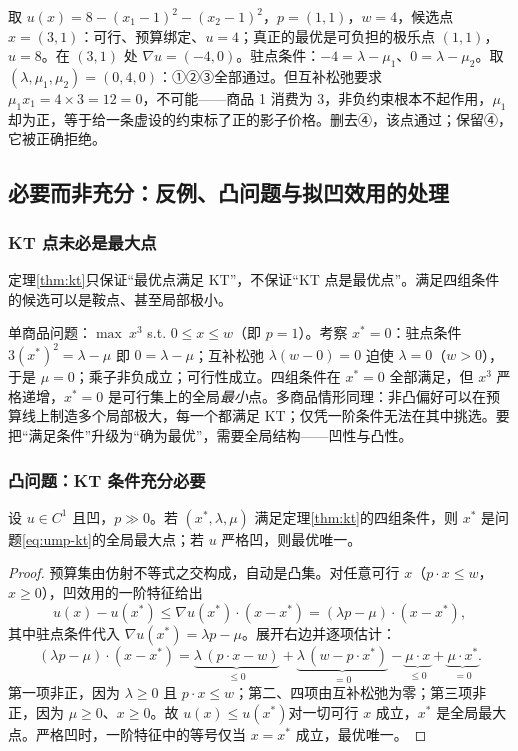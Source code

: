 \begin{example}
\label{ex:no-comp}
取 $u(x)=8-(x_1-1)^2-(x_2-1)^2$，$p=(1,1)$，$w=4$，候选点 $x=(3,1)$：可行、预算绑定、$u=4$；真正的最优是可负担的极乐点 $(1,1)$，$u=8$。在 $(3,1)$ 处 $\nabla u=(-4,0)$。驻点条件：$-4=\lambda-\mu_1$、$0=\lambda-\mu_2$。取 $(\lambda,\mu_1,\mu_2)=(0,4,0)$：①②③全部通过。但互补松弛要求 $\mu_1x_1=4\times 3=12=0$，不可能——商品 1 消费为 3，非负约束根本不起作用，$\mu_1$ 却为正，等于给一条虚设的约束标了正的影子价格。删去④，该点通过；保留④，它被正确拒绝。
\end{example}

\subsection{必要而非充分：反例、凸问题与拟凹效用的处理}
\label{sec:kt-suff}

\subsubsection{KT 点未必是最大点}

定理\ref{thm:kt}只保证“最优点满足 KT”，不保证“KT 点是最优点”。满足四组条件的候选可以是鞍点、甚至局部极小。

\begin{example}[KT 点是全局最小点]
\label{ex:saddle}
单商品问题：$\max\ x^3$ s.t. $0\le x\le w$（即 $p=1$）。考察 $x^*=0$：驻点条件 $3(x^*)^2=\lambda-\mu$ 即 $0=\lambda-\mu$；互补松弛 $\lambda(w-0)=0$ 迫使 $\lambda=0$（$w>0$），于是 $\mu=0$；乘子非负成立；可行性成立。四组条件在 $x^*=0$ 全部满足，但 $x^3$ 严格递增，$x^*=0$ 是可行集上的全局\emph{最小}点。多商品情形同理：非凸偏好可以在预算线上制造多个局部极大，每一个都满足 KT；仅凭一阶条件无法在其中挑选。要把“满足条件”升级为“确为最优”，需要全局结构——凹性与凸性。
\end{example}

\subsubsection{凸问题：KT 条件充分必要}

\begin{theorem}[凸问题的充分性]
\label{thm:convex-suff}
设 $u\in C^1$ 且凹，$p\gg 0$。若 $(x^*,\lambda,\mu)$ 满足定理\ref{thm:kt}的四组条件，则 $x^*$ 是问题\eqref{eq:ump-kt}的全局最大点；若 $u$ 严格凹，则最优唯一。
\end{theorem}
\begin{proof}
预算集由仿射不等式之交构成，自动是凸集。对任意可行 $x$（$p\cdot x\le w$，$x\ge0$），凹效用的一阶特征给出
\[
 u(x)-u(x^*)\le\nabla u(x^*)\cdot(x-x^*)=(\lambda p-\mu)\cdot(x-x^*),
\]
其中驻点条件代入 $\nabla u(x^*)=\lambda p-\mu$。展开右边并逐项估计：
\[
 (\lambda p-\mu)\cdot(x-x^*)
 =\underbrace{\lambda\,(p\cdot x-w)}_{\le 0}
  +\underbrace{\lambda\,(w-p\cdot x^*)}_{=0}
  -\underbrace{\mu\cdot x}_{\le 0}
  +\underbrace{\mu\cdot x^*}_{=0}.
\]
第一项非正，因为 $\lambda\ge0$ 且 $p\cdot x\le w$；第二、四项由互补松弛为零；第三项非正，因为 $\mu\ge0$、$x\ge0$。故 $u(x)\le u(x^*)$对一切可行 $x$ 成立，$x^*$ 是全局最大点。严格凹时，一阶特征中的等号仅当 $x=x^*$ 成立，最优唯一。
\end{proof}

